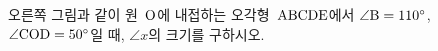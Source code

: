 \noindent\begin{minipage}[t]{0.58\linewidth}\vspace{0pt}\raggedright 오른쪽 그림과 같이 원~$\mathrm{O}$에 내접하는 오각형~$\mathrm{ABCDE}$에서 $\angle\mathrm{B}=110^\circ$, $\angle\mathrm{COD}=50^\circ$일 때, $\angle x$의 크기를 구하시오.\end{minipage}\hfill\begin{minipage}[t]{0.4\linewidth}\vspace{0pt}\centering \resizebox{\ifdim\width>\linewidth\linewidth\else\width\fi}{!}{}\end{minipage}\par
